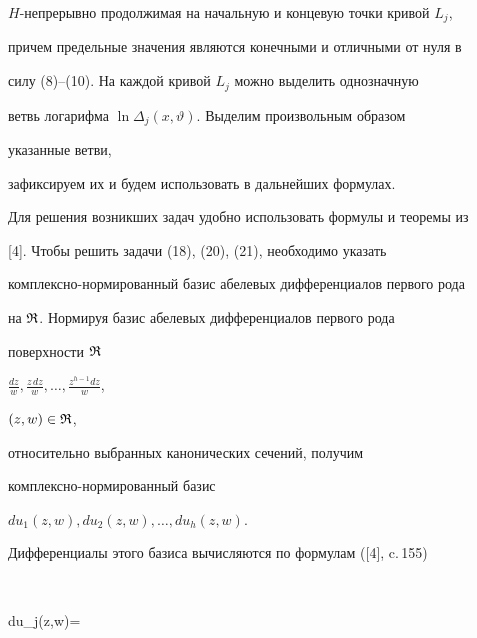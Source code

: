 $H$-непрерывно продолжимая на начальную и концевую точки кривой $L_j$, 


причем предельные значения являются конечными и отличными от нуля в 


силу (8)--(10). На каждой кривой $L_j$ можно выделить однозначную 


ветвь логарифма $\ln\Delta_j(x,\vartheta)$. Выделим произвольным образом 


указанные ветви, 


зафиксируем их и будем использовать в дальнейших формулах. 


 


Для решения возникших задач удобно использовать формулы и теоремы из 


[4]. Чтобы решить задачи (18), (20), (21), необходимо указать 


комплексно-нормированный базис абелевых дифференциалов первого рода 


на $\frak R$. Нормируя базис абелевых дифференциалов первого рода 


поверхности $\frak R$\; 


$\frac{dz}{w},\frac{z\,dz}{w},\dotsc,\frac{z^{h-1}dz}{w}$, 


$(z,w)\in\frak R$,


относительно выбранных канонических сечений, получим 


комплексно-нормированный базис 


$du_1(z,w),du_2(z,w),\dotsc,du_h(z,w)$. 


Дифференциалы этого базиса вычисляются по формулам ([4], c.\,155) 


$$ 


du_j(z,w)= 




